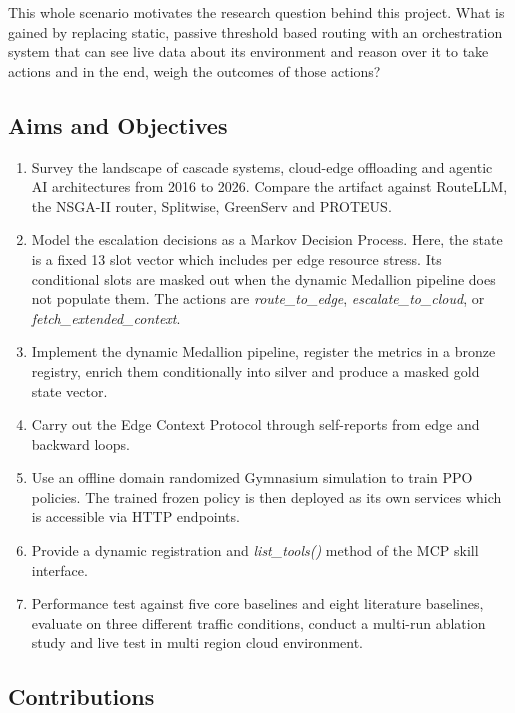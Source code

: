 This whole scenario motivates the research question behind this project.
What is gained by replacing static, passive threshold based routing with
an orchestration system that can see live data about its
environment and reason over it to take actions and in the end, weigh the
outcomes of those actions?

\hypertarget{aims-and-objectives}{%
\subsection{Aims and Objectives}\label{aims-and-objectives}}
\begin{enumerate}
\def\labelenumi{\arabic{enumi}.}
    \item Survey the landscape of cascade systems, cloud-edge offloading
    and agentic AI architectures from 2016 to 2026. Compare the artifact
    against RouteLLM, the NSGA-II router, Splitwise, GreenServ and
    PROTEUS.
    \item Model the escalation decisions as a Markov Decision Process.
    Here, the state is a fixed 13 slot vector which includes per edge
    resource stress. Its conditional slots are masked out when the
    dynamic Medallion pipeline does not populate them. The actions are
    \emph{route\_to\_edge}, \emph{escalate\_to\_cloud}, or
    \emph{fetch\_extended\_context}.
    \item Implement the dynamic Medallion pipeline, register the metrics
    in a bronze registry, enrich them conditionally into silver and
    produce a masked gold state vector.
    \item Carry out the Edge Context Protocol through self-reports from
    edge and backward loops.
    \item Use an offline domain randomized Gymnasium simulation to train
    PPO policies. The trained frozen policy is then deployed as its own
    services which is accessible via HTTP endpoints.
    \item Provide a dynamic registration and \emph{list\_tools()} method
    of the MCP skill interface.
    \item Performance test against five core baselines and eight
    literature baselines, evaluate on three different traffic
    conditions, conduct a multi-run ablation study and live test in
    multi region cloud environment.
\end{enumerate}

\hypertarget{contributions}{%
\subsection{Contributions}\label{contributions}}

